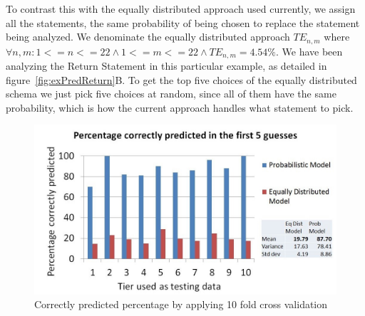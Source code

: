 \documentclass[conference]{IEEEtran}
\begin{document}
To contrast this with the equally distributed approach used currently, 
we assign all the statements, the same probability of being chosen to replace 
the statement being analyzed. We denominate the equally distributed approach 
$TE_{n,m}$ where $\forall n,m: 1<=n<=22 \land 1<=m<=22 \land TE_{n,m} = 4.54\%$. 
We have been analyzing the Return Statement in this particular example, as 
detailed in figure~\ref{fig:exPredReturn}B. To get the top five choices of the 
equally distributed schema we just pick five choices at random, since all of 
them have the same probability, which is how the current approach handles what 
statement to pick.



\begin{figure}[!h]
  \centering
    \includegraphics[scale=0.33]{sanity1}
  \caption{Correctly predicted percentage by applying 10 fold cross validation}
  \label{fig:results10fcv}
\end{figure}
\end{document}

